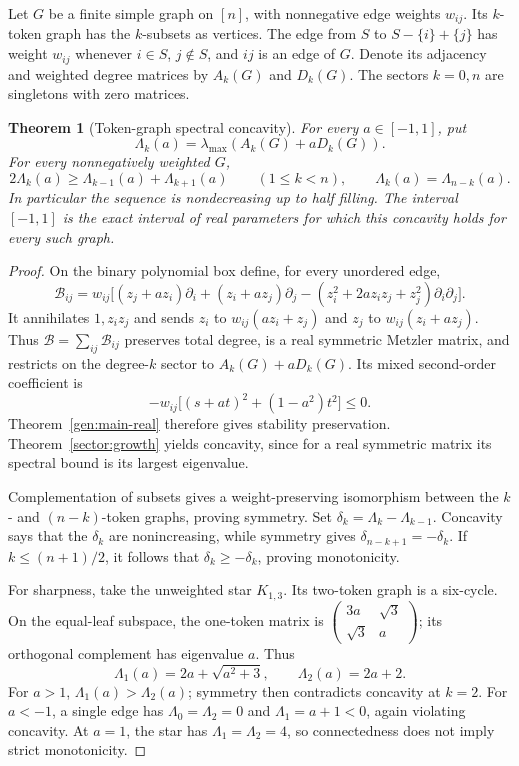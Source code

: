 \documentclass[reqno]{amsart}
\newtheorem{theorem}{Theorem}[section]
\theoremstyle{definition}
\theoremstyle{remark}
\begin{document}
Let \(G\) be a finite simple graph on \([n]\), with nonnegative edge
weights \(w_{ij}\). Its \(k\)-token graph has the \(k\)-subsets as
vertices. The edge from \(S\) to \(S-\{i\}+\{j\}\) has weight
\(w_{ij}\) whenever \(i\in S\), \(j\notin S\), and \(ij\) is an
edge of \(G\). Denote its adjacency and weighted degree matrices by
\(A_k(G)\) and \(D_k(G)\). The sectors \(k=0,n\) are singletons
with zero matrices.

\begin{theorem}[Token-graph spectral concavity]\label{sector:token}
For every \(a\in[-1,1]\), put
\[
 \Lambda_k(a)=\lambda_{\max}(A_k(G)+aD_k(G)).
\]
For every nonnegatively weighted \(G\),
\[
 2\Lambda_k(a)\ge\Lambda_{k-1}(a)+\Lambda_{k+1}(a)
 \qquad(1\le k<n),\qquad
 \Lambda_k(a)=\Lambda_{n-k}(a).
\]
In particular the sequence is nondecreasing up to half filling.
The interval \([-1,1]\) is the exact interval of real parameters
for which this concavity holds for every such graph.
\end{theorem}

\begin{proof}
On the binary polynomial box define, for every unordered edge,
\[
 \mathcal B_{ij}=w_{ij}\bigl[
 (z_j+az_i)\partial_i+(z_i+az_j)\partial_j
 -(z_i^2+2az_iz_j+z_j^2)\partial_i\partial_j\bigr].
\]
It annihilates \(1,z_iz_j\) and sends
\(z_i\) to \(w_{ij}(az_i+z_j)\) and
\(z_j\) to \(w_{ij}(z_i+az_j)\).
Thus \(\mathcal B=\sum_{ij}\mathcal B_{ij}\) preserves total
degree, is a real symmetric Metzler matrix, and restricts on the
degree-\(k\) sector to \(A_k(G)+aD_k(G)\).
Its mixed second-order coefficient is
\[
 -w_{ij}\bigl[(s+at)^2+(1-a^2)t^2\bigr]\le0.
\]
Theorem~\ref{gen:main-real} therefore gives stability preservation.
Theorem~\ref{sector:growth} yields concavity, since for a real
symmetric matrix its spectral bound is its largest eigenvalue.

Complementation of subsets gives a weight-preserving isomorphism
between the \(k\)- and \((n-k)\)-token graphs, proving symmetry.
Set \(\delta_k=\Lambda_k-\Lambda_{k-1}\). Concavity says that
the \(\delta_k\) are nonincreasing, while symmetry gives
\(\delta_{n-k+1}=-\delta_k\). If \(k\le(n+1)/2\), it follows that
\(\delta_k\ge-\delta_k\), proving monotonicity.

For sharpness, take the unweighted star \(K_{1,3}\). Its two-token
graph is a six-cycle. On the equal-leaf subspace, the one-token
matrix is
\(\left(\begin{smallmatrix}3a&\sqrt3\\\sqrt3&a\end{smallmatrix}\right)\);
its orthogonal complement has eigenvalue \(a\). Thus
\[
 \Lambda_1(a)=2a+\sqrt{a^2+3},\qquad
 \Lambda_2(a)=2a+2.
\]
For \(a>1\), \(\Lambda_1(a)>\Lambda_2(a)\); symmetry then
contradicts concavity at \(k=2\). For \(a<-1\), a single edge
has \(\Lambda_0=\Lambda_2=0\) and \(\Lambda_1=a+1<0\), again
violating concavity. At \(a=1\), the star has
\(\Lambda_1=\Lambda_2=4\), so connectedness does not imply
strict monotonicity.
\end{proof}
\end{document}
